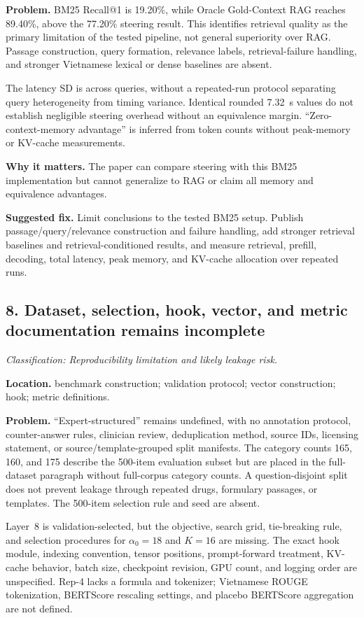 \documentclass[11pt]{article}
\newcommand{\findinglabel}[1]{\textbf{#1}}
\newcommand{\classification}[1]{\textit{Classification: #1.}}
\begin{document}
\findinglabel{Problem.} BM25 Recall@1 is 19.20\%, while Oracle Gold-Context RAG reaches 89.40\%, above the 77.20\% steering result.  This identifies retrieval quality as the primary limitation of the tested pipeline, not general superiority over RAG.  Passage construction, query formation, relevance labels, retrieval-failure handling, and stronger Vietnamese lexical or dense baselines are absent.

The latency SD is across queries, without a repeated-run protocol separating query heterogeneity from timing variance.  Identical rounded 7.32~s values do not establish negligible steering overhead without an equivalence margin.  ``Zero-context-memory advantage'' is inferred from token counts without peak-memory or KV-cache measurements.

\findinglabel{Why it matters.} The paper can compare steering with this BM25 implementation but cannot generalize to RAG or claim all memory and equivalence advantages.

\findinglabel{Suggested fix.} Limit conclusions to the tested BM25 setup.  Publish passage/query/relevance construction and failure handling, add stronger retrieval baselines and retrieval-conditioned results, and measure retrieval, prefill, decoding, total latency, peak memory, and KV-cache allocation over repeated runs.

\subsection*{8. Dataset, selection, hook, vector, and metric documentation remains incomplete}

\classification{Reproducibility limitation and likely leakage risk}

\findinglabel{Location.} benchmark construction; validation protocol; vector construction; hook; metric definitions.

\findinglabel{Problem.} ``Expert-structured'' remains undefined, with no annotation protocol, counter-answer rules, clinician review, deduplication method, source IDs, licensing statement, or source/template-grouped split manifests.  The category counts 165, 160, and 175 describe the 500-item evaluation subset but are placed in the full-dataset paragraph without full-corpus category counts.  A question-disjoint split does not prevent leakage through repeated drugs, formulary passages, or templates.  The 500-item selection rule and seed are absent.

Layer~8 is validation-selected, but the objective, search grid, tie-breaking rule, and selection procedures for $\alpha_0=18$ and $K=16$ are missing.  The exact hook module, indexing convention, tensor positions, prompt-forward treatment, KV-cache behavior, batch size, checkpoint revision, GPU count, and logging order are unspecified.  Rep-4 lacks a formula and tokenizer; Vietnamese ROUGE tokenization, BERTScore rescaling settings, and placebo BERTScore aggregation are not defined.
\end{document}
